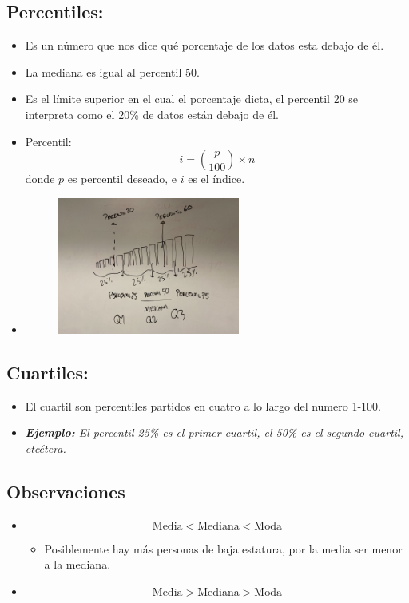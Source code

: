 \subsection{Percentiles:}
\begin{itemize}
    \item Es un número que nos dice qué porcentaje de los datos esta debajo de él.
    \item La mediana es igual al percentil 50.
    \item Es el límite superior en el cual el porcentaje dicta, el percentil 20 se interpreta como el 20\% de datos están debajo de él.
    \item Percentil:
        \[
          i = \left(\frac{p}{100}  \right) \times n
        \]
        donde $p$ es percentil deseado, e $i$ es el índice.
    
    \item 
        \begin{figure}[htbp]
            \centering
            \includegraphics[width=6cm]{Clases/Images/2020-01-14_01.jpeg} 
            \caption{}
            \label{}
        \end{figure} 
\end{itemize}

\subsection{Cuartiles:}
\begin{itemize}
    \item El cuartil son percentiles partidos en cuatro a lo largo del numero 1-100.
    \item \emph{\textbf{Ejemplo: }El percentil 25\% es el primer cuartil, el 50\% es el segundo cuartil, etcétera.}
\end{itemize}


\subsection{Observaciones}
\begin{itemize}
    \item \[
      \text{Media} < \text{Mediana} < \text{Moda}  
    \]
        \begin{itemize}
            \item Posiblemente hay más personas de baja estatura, por la media ser menor a la mediana.
        \end{itemize}
    
    \item \[
        \text{Media} > \text{Mediana} > \text{Moda}  
    \]
\end{itemize}
